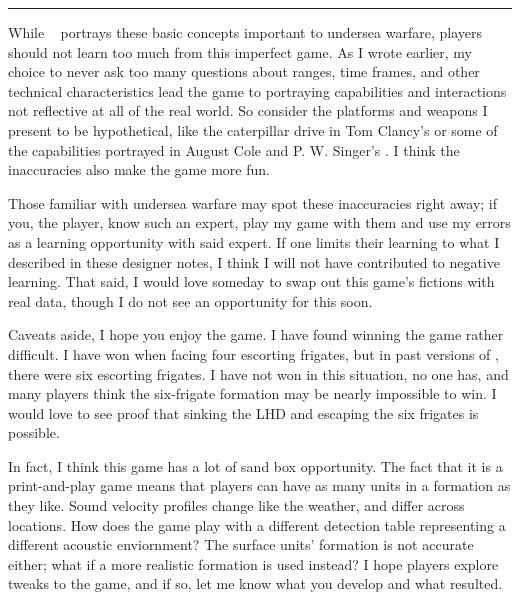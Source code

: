 \documentclass[../TacSubGameRules.tex]{subfiles}
\begin{document}
\begin{center}
    \noindent\rule{0.8\linewidth}{1pt}
\end{center}

While \gametitle~ portrays these basic concepts important to undersea warfare, players should not learn too much from this imperfect game.
As I wrote earlier, my choice to never ask too many questions about ranges, time frames, and other technical characteristics lead the game to portraying capabilities and interactions not reflective at all of the real world.
So consider the platforms and weapons I present to be hypothetical, like the caterpillar drive in Tom Clancy's  or some of the capabilities portrayed in August Cole and P. W. Singer's .
I think the inaccuracies also make the game more fun.

Those familiar with undersea warfare may spot these inaccuracies right away; if you, the player, know such an expert, play my game with them and use my errors as a learning opportunity with said expert.
If one limits their learning to what I described in these designer notes, I think I will not have contributed to negative learning.
That said, I would love someday to swap out this game's fictions with real data, though I do not see an opportunity for this soon.

Caveats aside, I hope you enjoy the game.
I have found winning the game rather difficult.
I have won when facing four escorting frigates, but in past versions of \gametitle, there were six escorting frigates.
I have not won in this situation, no one has, and many players think the six-frigate formation may be nearly impossible to win.
I would love to see proof that sinking the LHD and escaping the six frigates is possible.

In fact, I think this game has a lot of sand box opportunity.
The fact that it is a print-and-play game means that players can have as many units in a formation as they like.
Sound velocity profiles change like the weather, and differ across locations.
How does the game play with a different detection table representing a different acoustic enviornment?
The surface units' formation is not accurate either; what if a more realistic formation is used instead?
I hope players explore tweaks to the game, and if so, let me know what you develop and what resulted.
\end{document}
